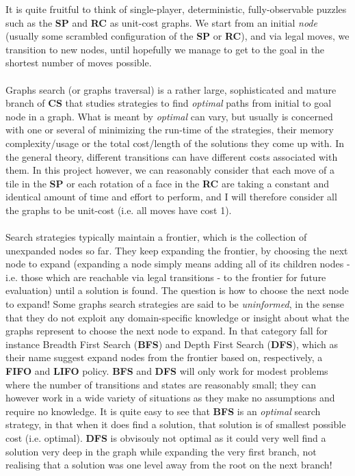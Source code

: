 It is quite fruitful to think of single-player, deterministic, fully-observable puzzles such as the \textbf{SP} and \textbf{RC} as unit-cost graphs. We start from an initial \textit{node} (usually some scrambled configuration of the \textbf{SP} or \textbf{RC}), and via legal moves, we transition to new nodes, until hopefully we manage to get to the goal in the shortest number of moves possible. 
\\
\\
Graphs search (or graphs traversal) is a rather large, sophisticated and mature branch of \textbf{CS} that studies strategies to find \textit{optimal} paths from initial to goal node in a graph. What is meant by \textit{optimal} can vary, but usually is concerned with one or several of minimizing the run-time of the strategies, their memory complexity/usage or the total cost/length of the solutions they come up with. In the general theory, different transitions can have different costs associated with them. In this project however, we can reasonably consider that each move of a tile in the \textbf{SP} or each rotation of a face in the \textbf{RC} are taking a constant and identical amount of time and effort to perform, and I will therefore consider all the graphs to be unit-cost (i.e. all moves have cost 1).
\\
\\
Search strategies typically maintain a frontier, which is the collection of unexpanded nodes so far. They keep expanding the frontier, by choosing the next node to expand (expanding a node simply means adding all of its children nodes - i.e. those which are reachable via legal transitions - to the frontier for future evaluation) until a solution is found. The question is how to choose the next node to expand! Some graphs search strategies are said to be \textit{uninformed}, in the sense that they do not exploit any domain-specific knowledge or insight about what the graphs represent to choose the next node to expand. In that category fall for instance Breadth First Search (\textbf{BFS}) and Depth First Search (\textbf{DFS}), which as their name suggest expand nodes from the frontier based on, respectively, a \textbf{FIFO} and \textbf{LIFO} policy. \textbf{BFS} and \textbf{DFS} will only work for modest problems where the number of transitions and states are reasonably small; they can however work in a wide variety of situations as they make no assumptions and require no knowledge. It is quite easy to see that \textbf{BFS} is an \textit{optimal} search strategy, in that when it does find a solution, that solution is of smallest possible cost (i.e. optimal). \textbf{DFS} is obvisouly not optimal as it could very well find a solution very deep in the graph while expanding the very first branch, not realising that a solution was one level away from the root on the next branch!
